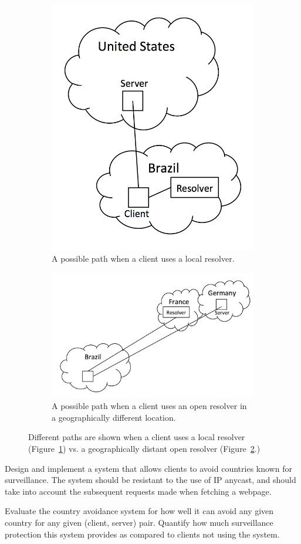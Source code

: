 \begin{figure}
\centering
\begin{subfigure}[t]{.5\textwidth}
  \centering
  \includegraphics[width=.4\linewidth]{no_open_resolver}
  \caption{A possible path when a client uses a local resolver.}
  \label{fig:local_resolver}
\end{subfigure}%
\begin{subfigure}[t]{.5\textwidth}
  \centering
  \includegraphics[width=.7\linewidth]{open_resolver}
  \caption{A possible path when a client uses an open resolver in a geographically different location.}
  \label{fig:open_resolver}
\end{subfigure}%
\caption{Different paths are shown when a client uses a local resolver (Figure~\ref{fig:local_resolver}) vs. a geographically distant open resolver (Figure~\ref{fig:open_resolver}.)}
\label{fig:resolvers}
\end{figure}

\begin{thm}
Design and implement a system that allows clients to avoid countries known for surveillance.  The system should be resistant to the use of IP anycast, and should take into account the subsequent requests made when fetching a webpage.
\end{thm}

\begin{thm}
Evaluate the country avoidance system for how well it can avoid any given country for any given (client, server) pair.  Quantify how much surveillance protection this system provides as compared to clients not using the system.
\end{thm}

